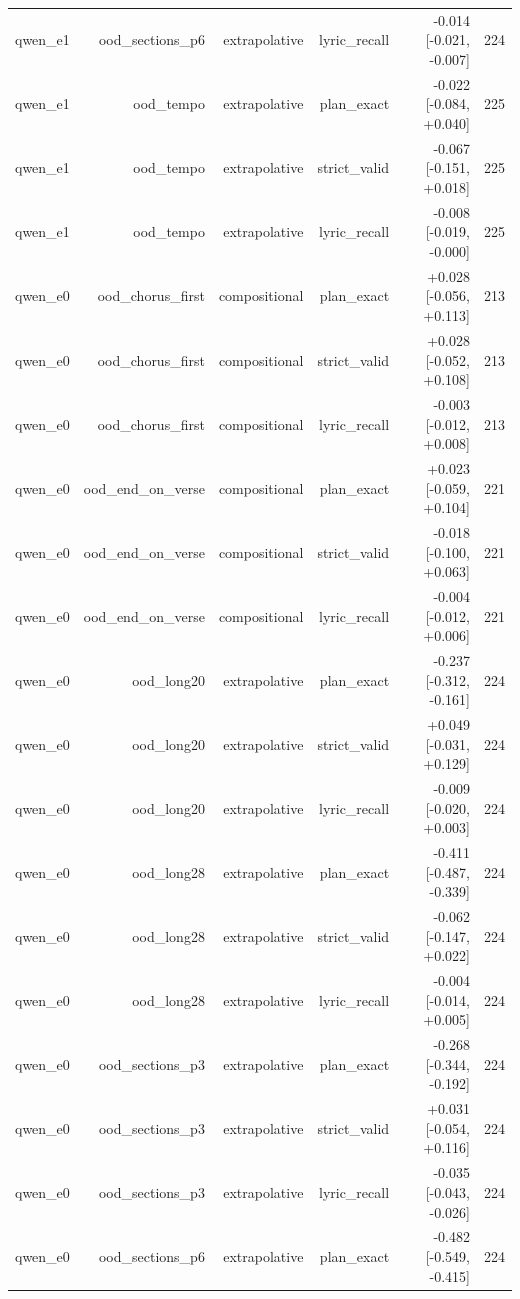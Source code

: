 \begin{table}[t]
\begin{tabular}{lrrrrr}
qwen\_e1 & ood\_sections\_p6 & extrapolative & lyric\_recall & -0.014 [-0.021, -0.007] & 224 \\
qwen\_e1 & ood\_tempo & extrapolative & plan\_exact & -0.022 [-0.084, +0.040] & 225 \\
qwen\_e1 & ood\_tempo & extrapolative & strict\_valid & -0.067 [-0.151, +0.018] & 225 \\
qwen\_e1 & ood\_tempo & extrapolative & lyric\_recall & -0.008 [-0.019, -0.000] & 225 \\
qwen\_e0 & ood\_chorus\_first & compositional & plan\_exact & +0.028 [-0.056, +0.113] & 213 \\
qwen\_e0 & ood\_chorus\_first & compositional & strict\_valid & +0.028 [-0.052, +0.108] & 213 \\
qwen\_e0 & ood\_chorus\_first & compositional & lyric\_recall & -0.003 [-0.012, +0.008] & 213 \\
qwen\_e0 & ood\_end\_on\_verse & compositional & plan\_exact & +0.023 [-0.059, +0.104] & 221 \\
qwen\_e0 & ood\_end\_on\_verse & compositional & strict\_valid & -0.018 [-0.100, +0.063] & 221 \\
qwen\_e0 & ood\_end\_on\_verse & compositional & lyric\_recall & -0.004 [-0.012, +0.006] & 221 \\
qwen\_e0 & ood\_long20 & extrapolative & plan\_exact & -0.237 [-0.312, -0.161] & 224 \\
qwen\_e0 & ood\_long20 & extrapolative & strict\_valid & +0.049 [-0.031, +0.129] & 224 \\
qwen\_e0 & ood\_long20 & extrapolative & lyric\_recall & -0.009 [-0.020, +0.003] & 224 \\
qwen\_e0 & ood\_long28 & extrapolative & plan\_exact & -0.411 [-0.487, -0.339] & 224 \\
qwen\_e0 & ood\_long28 & extrapolative & strict\_valid & -0.062 [-0.147, +0.022] & 224 \\
qwen\_e0 & ood\_long28 & extrapolative & lyric\_recall & -0.004 [-0.014, +0.005] & 224 \\
qwen\_e0 & ood\_sections\_p3 & extrapolative & plan\_exact & -0.268 [-0.344, -0.192] & 224 \\
qwen\_e0 & ood\_sections\_p3 & extrapolative & strict\_valid & +0.031 [-0.054, +0.116] & 224 \\
qwen\_e0 & ood\_sections\_p3 & extrapolative & lyric\_recall & -0.035 [-0.043, -0.026] & 224 \\
qwen\_e0 & ood\_sections\_p6 & extrapolative & plan\_exact & -0.482 [-0.549, -0.415] & 224 \\

\end{tabular}
\end{table}
